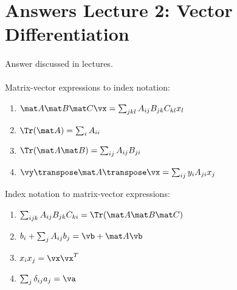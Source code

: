\section{Answers Lecture 2: Vector Differentiation}
\paragraph{} Answer discussed in lectures.

\paragraph{}

Matrix-vector expressions to index notation: 
\begin{enumerate}[label=\alph*.]
\item $\mat A \mat B \mat C \vx = \sum_{jkl} A_{ij} B_{jk} C_{kl} x_l$
\item $\Tr(\mat A) = \sum_i A_{ii}$
\item $\Tr(\mat A \mat B) = \sum_{ij} A_{ij} B_{ji}$
\item $\vy\transpose \mat A\transpose \vx = \sum_{ij} y_i A_{ji} x_j$
\end{enumerate}
Index notation to matrix-vector expressions:
\begin{enumerate}[label=\alph*.]
\item $\sum_{ijk} A_{ij}B_{jk}C_{ki} = \Tr(\mat A \mat B \mat C)$
\item $b_i + \sum_j A_{ij}b_j = \vb + \mat A \vb$
\item $x_ix_j = \vx \vx^T$
\item $\sum_j \delta_{ij}a_j = \va$
\end{enumerate}

\paragraph{}

